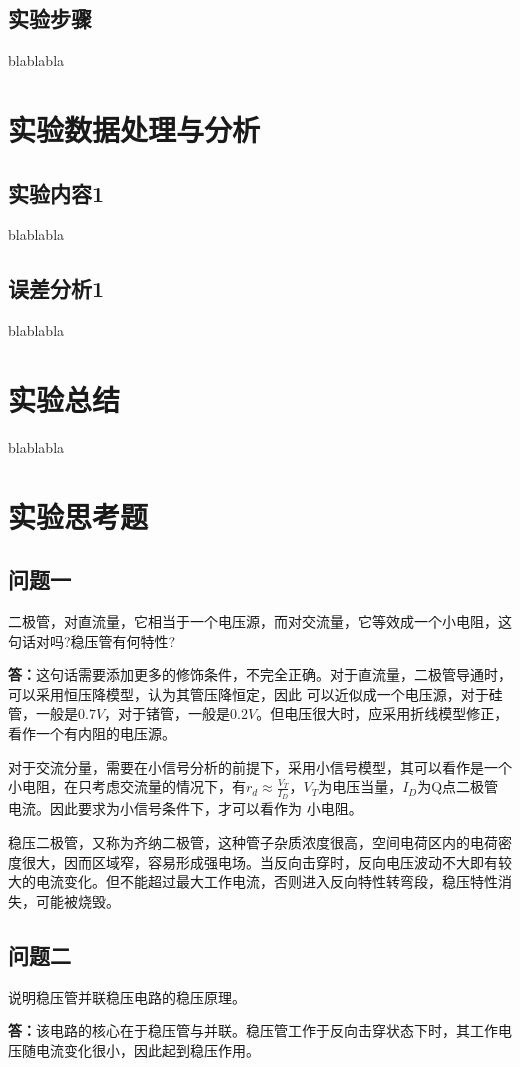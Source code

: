 \documentclass[a4paper,11pt,UTF8]{ctexart}
\begin{document}
\subsection{实验步骤}
	blablabla

\section{实验数据处理与分析}
\subsection{实验内容1}
	blablabla
\subsection{误差分析1}
	blablabla

\section{实验总结}
blablabla
\section{实验思考题}
\subsection{问题一}
二极管，对直流量，它相当于一个电压源，而对交流量，它等效成一个小电阻，这句话对吗?稳压管有何特性?

\textbf{答：}这句话需要添加更多的修饰条件，不完全正确。对于直流量，二极管导通时，可以采用恒压降模型，认为其管压降恒定，因此
可以近似成一个电压源，对于硅管，一般是$0.7V$，对于锗管，一般是$0.2V$。但电压很大时，应采用折线模型修正，看作一个有内阻的电压源。

对于交流分量，需要在小信号分析的前提下，采用小信号模型，其可以看作是一个小电阻，在只考虑交流量的情况下，有$r_d\approx\frac{V_T}{I_D}$，$V_T$为电压当量，$I_D$为Q点二极管电流。因此要求为小信号条件下，才可以看作为
小电阻。

稳压二极管，又称为齐纳二极管，这种管子杂质浓度很高，空间电荷区内的电荷密度很大，因而区域窄，容易形成强电场。当反向击穿时，反向电压波动不大即有较大的电流变化。但不能超过最大工作电流，否则进入反向特性转弯段，稳压特性消失，可能被烧毁。
\subsection{问题二}
说明稳压管并联稳压电路的稳压原理。

\textbf{答：}该电路的核心在于稳压管与并联。稳压管工作于反向击穿状态下时，其工作电压随电流变化很小，因此起到稳压作用。
\end{document}
